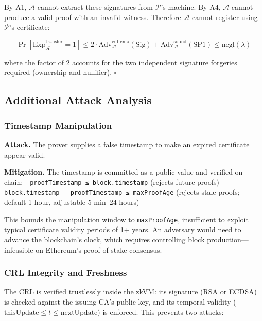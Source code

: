 \documentclass[11pt, a4paper]{article}
\begin{document}
By A1, \(\mathcal{A}\) cannot extract these signatures from
\(\mathcal{P}\)'s machine. By A4, \(\mathcal{A}\) cannot produce a valid
proof with an invalid witness. Therefore \(\mathcal{A}\) cannot register
using \(\mathcal{P}\)'s certificate:

\[\Pr[\text{Exp}_{\mathcal{A}}^{\text{transfer}} = 1] \leq 2 \cdot \text{Adv}_{\mathcal{A}}^{\text{euf-cma}}(\text{Sig}) + \text{Adv}_{\mathcal{A}}^{\text{sound}}(\text{SP1}) \leq \text{negl}(\lambda)\]

where the factor of 2 accounts for the two independent signature
forgeries required (ownership and nullifier). \(\square\)

\subsection{Additional Attack
Analysis}\label{additional-attack-analysis}

\subsubsection{Timestamp Manipulation}\label{timestamp-manipulation}

\textbf{Attack.} The prover supplies a false timestamp to make an
expired certificate appear valid.

\textbf{Mitigation.} The timestamp is committed as a public value and
verified on-chain: - \texttt{proofTimestamp\ ≤\ block.timestamp}
(rejects future proofs) -
\texttt{block.timestamp\ -\ proofTimestamp\ ≤\ maxProofAge} (rejects
stale proofs; default 1 hour, adjustable 5 min--24 hours)

This bounds the manipulation window to \texttt{maxProofAge},
insufficient to exploit typical certificate validity periods of 1+
years. An adversary would need to advance the blockchain's clock, which
requires controlling block production---infeasible on Ethereum's
proof-of-stake consensus.

\subsubsection{CRL Integrity and
Freshness}\label{crl-integrity-and-freshness}

The CRL is verified trustlessly inside the zkVM: its signature (RSA or
ECDSA) is checked against the issuing CA's public key, and its temporal
validity (\(\text{thisUpdate} \leq t \leq \text{nextUpdate}\)) is
enforced. This prevents two attacks:
\end{document}
